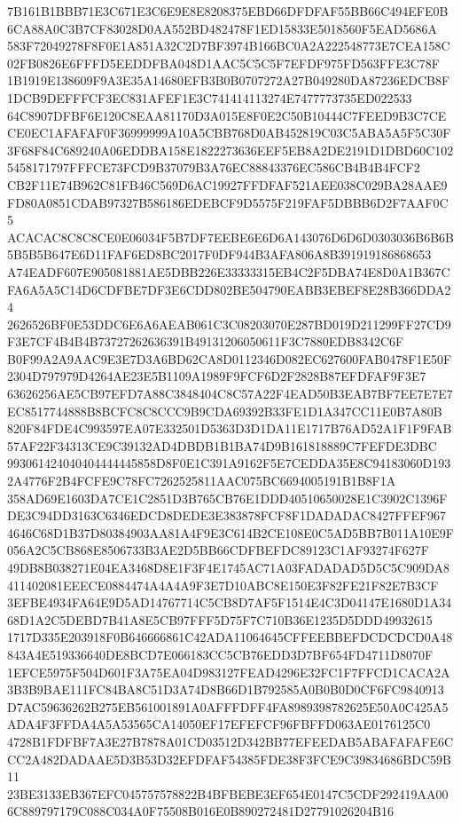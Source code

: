 \documentclass[UTF8,fontset=fandol,zihao=-4,a4paper]{ctexart}
\begin{document}
{{7B161B1BBB71E3C671E3C6E9E8E8208375EBD66DFDFAF55BB66C494EFE0B6CA88A0C3B7CF83028D0AA552BD482478F1ED15833E5018560F5EAD5686A
583F72049278F8F0E1A851A32C2D7BF3974B166BC0A2A222548773E7CEA158C02FB0826E6FFFD5EEDDFBA048D1AAC5C5C5F7EFDF975FD563FFE3C78F
1B1919E138609F9A3E35A14680EFB3B0B0707272A27B049280DA87236EDCB8F1DCB9DEFFFCF3EC831AFEF1E3C741414113274E7477773735ED022533
64C8907DFBF6E120C8EAA81170D3A015E8F0E2C50B10444C7FEED9B3C7CECE0EC1AFAFAF0F36999999A10A5CBB768D0AB452819C03C5ABA5A5F5C30F
3F68F84C689240A06EDDBA158E1822273636EEF5EB8A2DE2191D1DBD60C1025458171797FFFCE73FCD9B37079B3A76EC88843376EC586CB4B4B4FCF2
CB2F11E74B962C81FB46C569D6AC19927FFDFAF521AEE038C029BA28AAE9FD80A0851CDAB97327B586186EDEBCF9D5575F219FAF5DBBB6D2F7AAF0C5
ACACAC8C8C8CE0E06034F5B7DF7EEBE6E6D6A143076D6D6D0303036B6B6B5B5B5B647E6D11FAF6ED8BC2017F0DF944B3AFA806A8B391919186868653
A74EADF607E905081881AE5DBB226E33333315EB4C2F5DBA74E8D0A1B367CFA6A5A5C14D6CDFBE7DF3E6CDD802BE504790EABB3EBEF8E28B366DDA24
2626526BF0E53DDC6E6A6AEAB061C3C08203070E287BD019D211299FF27CD9F3E7CF4B4B4B73727262636391B49131206050611F3C7880EDB8342C6F
B0F99A2A9AAC9E3E7D3A6BD62CA8D0112346D082EC627600FAB0478F1E50F2304D797979D4264AE23E5B1109A1989F9FCF6D2F2828B87EFDFAF9F3E7
63626256AE5CB97EFD7A88C3848404C8C57A22F4EAD50B3EAB7BF7EE7E7E7EC8517744888B8BCFC8C8CCC9B9CDA69392B33FE1D1A347CC11E0B7A80B
820F84FDE4C993597EA07E332501D5363D3D1DA11E1717B76AD52A1F1F9FAB57AF22F34313CE9C39132AD4DBDB1B1BA74D9B161818889C7FEFDE3DBC
993061424040404444445858D8F0E1C391A9162F5E7CEDDA35E8C94183060D1932A4776F2B4FCFE9C78FC7262525811AAC075BC6694005191B1B8F1A
358AD69E1603DA7CE1C2851D3B765CB76E1DDD40510650028E1C3902C1396FDE3C94DD3163C6346EDCD8DEDE3E383878FCF8F1DADADAC8427FFEF967
4646C68D1B37D80384903AA81A4F9E3C614B2CE108E0C5AD5BB7B011A10E9F056A2C5CB868E8506733B3AE2D5BB66CDFBEFDC89123C1AF93274F627F
49DB8B038271E04EA3468D8E1F3F4E1745AC71A03FADADAD5D5C5C909DA8411402081EEECE0884474A4A4A9F3E7D10ABC8E150E3F82FE21F82E7B3CF
3EFBE4934FA64E9D5AD14767714C5CB8D7AF5F1514E4C3D04147E1680D1A3468D1A2C5DEBD7B41A8E5CB97FFF5D75F7C710B36E1235D5DDD49932615
1717D335E203918F0B646666861C42ADA11064645CFFEEBBEFDCDCDCD0A48843A4E519336640DE8BCD7E066183CC5CB76EDD3D7BF654FD4711D8070F
1EFCE5975F504D601F3A75EA04D983127FEAD4296E32FC1F7FFCD1CACA2A3B3B9BAE111FC84BA8C51D3A74D8B66D1B792585A0B0B0D0CF6FC9840913
D7AC59636262B275EB561001891A0AFFFDFF4FA8989398782625E50A0C425A5ADA4F3FFDA4A5A53565CA14050EF17EFEFCF96FBFFD063AE0176125C0
4728B1FDFBF7A3E27B7878A01CD03512D342BB77EFEEDAB5ABAFAFAFE6CCC2A482DADAAE5D3B53D32EFDFAF54385FDE38F3FCE9C39834686BDC59B11
23BE3133EB367EFC045757578822B4BFBEBE3EF654E0147C5CDF292419AA006C889797179C088C034A0F75508B016E0B890272481D27791026204B16
}}
\end{document}
